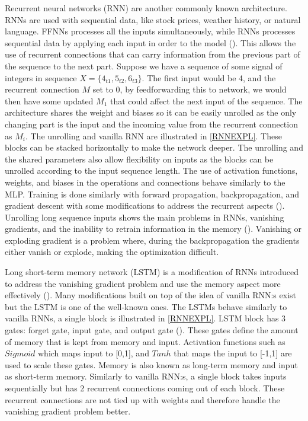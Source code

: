 Recurrent neural networks (RNN) are another commonly known architecture. RNNs are used with sequential data, like stock prices, weather history, or natural language. FFNNs processes all the inputs simultaneously, while RNNs processes sequential data by applying each input in order to the model (\cite{schuster1997bidirectional}). This allows the use of recurrent connections that can carry information from the previous part of the sequence to the next part. Suppose we have a sequence of some signal of integers in sequence \(X = \{ 4_{t1},5_{t2},6_{t3} \}\). The first input would be 4, and the recurrent connection \(M\) set to 0, by feedforwarding this to network, we would then have some updated \(M_1\) that could affect the next input of the sequence. The architecture shares the weight and biases so it can be easily unrolled as the only changing part is the input and the incoming value from the recurrent connection as \(M_i\). The unrolling and vanilla RNN are illustrated in \ref{RNNEXPL}. These blocks can be stacked horizontally to make the network deeper. The unrolling and the shared parameters also allow flexibility on inputs as the blocks can be unrolled according to the input sequence length. The use of activation functions, weights, and biases in the operations and connections behave similarly to the MLP. Training is done similarly with forward propagation, backpropagation, and gradient descent with some modifications to address the recurrent aspects (\cite{biglecun}). Unrolling long sequence inputs shows the main problems in RNNs, vanishing gradients, and the inability to retrain information in the memory (\cite{hochreiter1998vanishing}). Vanishing or exploding gradient is a problem where, during the backpropagation the gradients either vanish or explode, making the optimization difficult.

Long short-term memory network (LSTM) is a modification of RNNs introduced to address the vanishing gradient problem and use the memory aspect more effectively (\cite{LSTMS}). Many modifications built on top of the idea of vanilla RNN:s exist but the LSTM is one of the well-known ones. The LSTMs behave similarly to vanilla RNNs, a single block is illustrated in \ref{RNNEXPL}. LSTM block has 3 gates: forget gate, input gate, and output gate (\cite{LSTMFORGET}). These gates define the amount of memory that is kept from memory and input. Activation functions such as \(Sigmoid\) which maps input to [0,1], and \(Tanh\) that maps the input to [-1,1] are used to scale these gates.  Memory is also known as long-term memory and input as short-term memory. Similarly to vanilla RNN:s, a single block takes inputs sequentially but has 2 recurrent connections coming out of each block. These recurrent connections are not tied up with weights and therefore handle the vanishing gradient problem better.

